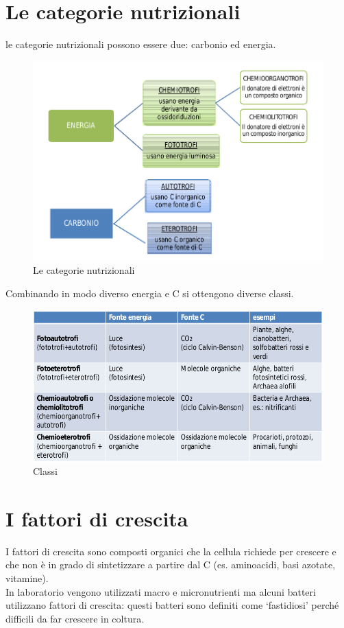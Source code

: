\documentclass[11pt]{book}
\begin{document}
\clearpage
\section{Le categorie nutrizionali}
le categorie nutrizionali possono essere due: carbonio ed energia.

\begin{figure}[htp]
\centering
\includegraphics[scale=0.5]{img/Categorie nutrizionali.png}
\caption{Le categorie nutrizionali}
\label{}
\end{figure}

\clearpage
Combinando in modo diverso energia e C si ottengono diverse classi.

\begin{figure}[htp]
\centering
\includegraphics[scale=0.5]{img/Combinazioni energia e carbonio.png}
\caption{Classi}
\label{}
\end{figure}

\section{I fattori di crescita}
I fattori di crescita sono composti organici che la cellula richiede per crescere e che non è in grado di sintetizzare a partire dal C (es. aminoacidi, basi azotate, vitamine).\\
In laboratorio vengono utilizzati macro e micronutrienti ma alcuni batteri utilizzano fattori di crescita: questi batteri sono definiti come ‘fastidiosi’ perché difficili da far crescere in coltura.
\end{document}
